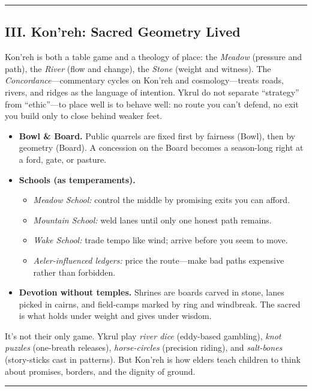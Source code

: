 \documentclass[11pt,letterpaper]{article}
\begin{document}
\medskip\hrule\medskip

\subsection{III. Kon'reh: Sacred Geometry Lived}

Kon'reh is both a table game and a theology of place: the \emph{Meadow} (pressure and path), the \emph{River} (flow and change), the \emph{Stone} (weight and witness). The \emph{Concordance}---commentary cycles on Kon'reh and cosmology---treats roads, rivers, and ridges as the language of intention. Ykrul do not separate ``strategy'' from ``ethic''---to place well is to behave well: no route you can't defend, no exit you build only to close behind weaker feet.

\begin{itemize}[leftmargin=*]
  \item \textbf{Bowl \& Board.} Public quarrels are fixed first by fairness (Bowl), then by geometry (Board). A concession on the Board becomes a season-long right at a ford, gate, or pasture.
  \item \textbf{Schools (as temperaments).}
    \begin{itemize}
      \item \emph{Meadow School:} control the middle by promising exits you can afford.
      \item \emph{Mountain School:} weld lanes until only one honest path remains.
      \item \emph{Wake School:} trade tempo like wind; arrive before you seem to move.
      \item \emph{Aeler-influenced ledgers:} price the route---make bad paths expensive rather than forbidden.
    \end{itemize}
  \item \textbf{Devotion without temples.} Shrines are boards carved in stone, lanes picked in cairns, and field-camps marked by ring and windbreak. The sacred is what holds under weight and gives under wisdom.
\end{itemize}

It's not their only game. Ykrul play \emph{river dice} (eddy-based gambling), \emph{knot puzzles} (one-breath releases), \emph{horse-circles} (precision riding), and \emph{salt-bones} (story-sticks cast in patterns). But Kon'reh is how elders teach children to think about promises, borders, and the dignity of ground.

\medskip\hrule\medskip
\end{document}
